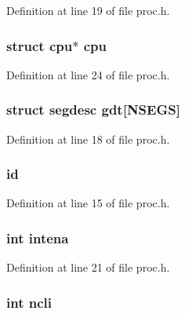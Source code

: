 Definition at line 19 of file proc.\-h.

\hypertarget{structcpu_a01255252d6a6f1a4d5550f72dfe3a733}{
\subsubsection[{cpu}]{\setlength{\rightskip}{0pt plus 5cm}struct {\bf cpu}$\ast$ {\bf cpu}}}\label{structcpu_a01255252d6a6f1a4d5550f72dfe3a733}


Definition at line 24 of file proc.\-h.

\hypertarget{structcpu_ad9d6d1fdf72705e51d5024df0f2e69a5}{
\subsubsection[{gdt}]{\setlength{\rightskip}{0pt plus 5cm}struct {\bf segdesc} gdt\mbox{[}{\bf N\-S\-E\-G\-S}\mbox{]}}}\label{structcpu_ad9d6d1fdf72705e51d5024df0f2e69a5}


Definition at line 18 of file proc.\-h.

\hypertarget{structcpu_a1a656e73d1ea05b0fe2307f8a5eab1b1}{
\subsubsection[{id}]{ id}}\label{structcpu_a1a656e73d1ea05b0fe2307f8a5eab1b1}


Definition at line 15 of file proc.\-h.

\hypertarget{structcpu_ad4abc2486db103b06edb4f8870d1cda8}{
\subsubsection[{intena}]{\setlength{\rightskip}{0pt plus 5cm}int intena}}\label{structcpu_ad4abc2486db103b06edb4f8870d1cda8}


Definition at line 21 of file proc.\-h.

\hypertarget{structcpu_a47f2115921397412b52d8aa2680510ec}{
\subsubsection[{ncli}]{\setlength{\rightskip}{0pt plus 5cm}int ncli}}\label{structcpu_a47f2115921397412b52d8aa2680510ec}


